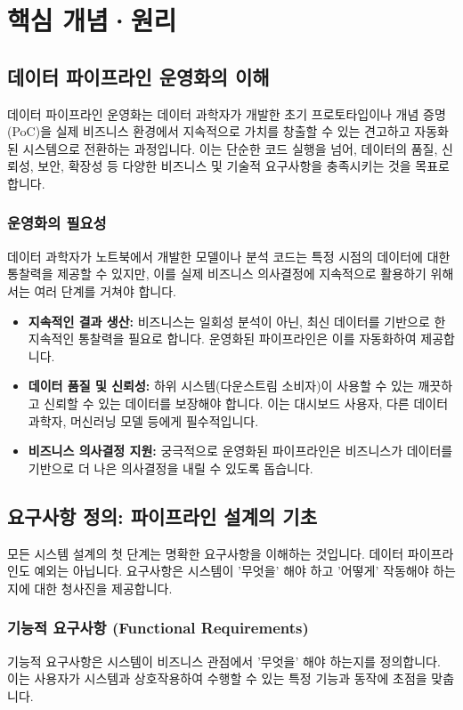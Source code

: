 \documentclass[11pt,a4paper]{article}
\theoremstyle{definition}
\newcommand{\newsection}[1]{\newpage\section{#1}}
\begin{document}
\newsection{핵심 개념·원리}

\subsection{데이터 파이프라인 운영화의 이해}

\begin{conceptbox}
데이터 파이프라인 운영화는 데이터 과학자가 개발한 초기 프로토타입이나 개념 증명(PoC)을 실제 비즈니스 환경에서 지속적으로 가치를 창출할 수 있는 견고하고 자동화된 시스템으로 전환하는 과정입니다. 이는 단순한 코드 실행을 넘어, 데이터의 품질, 신뢰성, 보안, 확장성 등 다양한 비즈니스 및 기술적 요구사항을 충족시키는 것을 목표로 합니다.
\end{conceptbox}

\subsubsection{운영화의 필요성}
데이터 과학자가 노트북에서 개발한 모델이나 분석 코드는 특정 시점의 데이터에 대한 통찰력을 제공할 수 있지만, 이를 실제 비즈니스 의사결정에 지속적으로 활용하기 위해서는 여러 단계를 거쳐야 합니다.

\begin{itemize}
    \item \textbf{지속적인 결과 생산:} 비즈니스는 일회성 분석이 아닌, 최신 데이터를 기반으로 한 지속적인 통찰력을 필요로 합니다. 운영화된 파이프라인은 이를 자동화하여 제공합니다.
    \item \textbf{데이터 품질 및 신뢰성:} 하위 시스템(다운스트림 소비자)이 사용할 수 있는 깨끗하고 신뢰할 수 있는 데이터를 보장해야 합니다. 이는 대시보드 사용자, 다른 데이터 과학자, 머신러닝 모델 등에게 필수적입니다.
    \item \textbf{비즈니스 의사결정 지원:} 궁극적으로 운영화된 파이프라인은 비즈니스가 데이터를 기반으로 더 나은 의사결정을 내릴 수 있도록 돕습니다.
\end{itemize}

\subsection{요구사항 정의: 파이프라인 설계의 기초}

모든 시스템 설계의 첫 단계는 명확한 요구사항을 이해하는 것입니다. 데이터 파이프라인도 예외는 아닙니다. 요구사항은 시스템이 '무엇을' 해야 하고 '어떻게' 작동해야 하는지에 대한 청사진을 제공합니다.

\subsubsection{기능적 요구사항 (Functional Requirements)}
기능적 요구사항은 시스템이 비즈니스 관점에서 '무엇을' 해야 하는지를 정의합니다. 이는 사용자가 시스템과 상호작용하여 수행할 수 있는 특정 기능과 동작에 초점을 맞춥니다.
\end{document}

